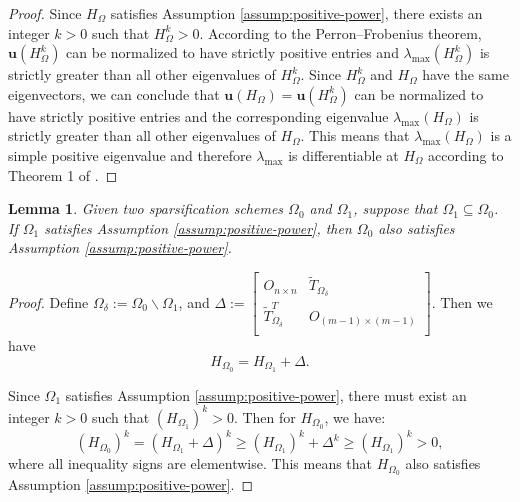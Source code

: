 \documentclass{article}
\theoremstyle{plain}
\newtheorem{lemma}[theorem]{Lemma}
\theoremstyle{definition}
\theoremstyle{remark}
\begin{document}
\begin{proof}
Since $H_{\Omega}$ satisfies Assumption \ref{assump:positive-power}, there exists an integer $k > 0$ such that $H_{\Omega}^k > 0$.
According to the Perron--Frobenius theorem,
$\mathbf{u}(H_{\Omega}^k)$ can be normalized to have strictly positive entries and $\lambda_{\max}(H_{\Omega}^k)$ is strictly greater than all other eigenvalues of $H_{\Omega}^k$. Since $H_{\Omega}^k$ and $H_{\Omega}$ have the same eigenvectors, we can conclude that $\mathbf{u}(H_{\Omega}) = \mathbf{u}(H_{\Omega}^k)$ can be normalized to have strictly positive entries and the corresponding eigenvalue $\lambda_{\max}(H_{\Omega})$ is strictly greater than all other eigenvalues of $H_{\Omega}$. This means that $\lambda_{\max}(H_{\Omega})$ is a simple positive eigenvalue and therefore $\lambda_{\max}$ is differentiable at $H_{\Omega}$ according to Theorem 1 of \citet{magnus1985differentiating}.
\end{proof}

\begin{lemma} \label{lem:monotonicity-of-assumption}
    Given two sparsification schemes $\Omega_0$ and $\Omega_1$, suppose that $\Omega_1 \subseteq \Omega_0$. If $\Omega_1$ satisfies Assumption \ref{assump:positive-power}, then $\Omega_0$ also satisfies Assumption \ref{assump:positive-power}.
\end{lemma}
\begin{proof}
    Define $\Omega_{\delta} := \Omega_0 \backslash \Omega_1$, and $\Delta := \begin{bmatrix}
        O_{n \times n} & \tilde{T}_{\Omega_{\delta}} \\
        \tilde{T}_{\Omega_{\delta}}^T & O_{(m-1) \times (m-1)} \\
    \end{bmatrix}$. Then we have
    \[
    H_{\Omega_0} = H_{\Omega_1} + \Delta.
    \]

Since $\Omega_1$ satisfies Assumption \ref{assump:positive-power}, there must exist an integer $k>0$ such that $(H_{\Omega_1})^k > 0$. Then for $H_{\Omega_0}$, we have:
    \[
        (H_{\Omega_0})^k = (H_{\Omega_1} + \Delta)^k \geq (H_{\Omega_1})^k + \Delta^k \geq (H_{\Omega_1})^k > 0,
    \]
where all inequality signs are elementwise. This means that $H_{\Omega_0}$ also satisfies Assumption \ref{assump:positive-power}.
\end{proof}
\end{document}
